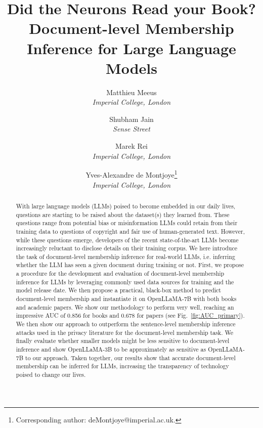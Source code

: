\documentclass[twocolumn,10pt]{article}
\begin{document}
\date{}

\title{\Large \bf Did the Neurons Read your Book? \\
        Document-level Membership Inference for Large Language Models
        \vspace*{0.5cm}}

\author{
 {\rm Matthieu Meeus}\\
 \textit{Imperial College, London}
 \and
 {\rm Shubham Jain}\\
 \textit{Sense Street}
  \and
  {\rm Marek Rei}\\
 \textit{Imperial College, London}
 \and
  {\rm Yves-Alexandre de Montjoye\footnote{Corresponding author: deMontjoye@imperial.ac.uk.}}\\
 \textit{Imperial College, London}
} 

\maketitle

\begin{abstract}


With large language models (LLMs) poised to become embedded in our daily lives, questions are starting to be raised about the dataset(s) they learned from. These questions range from potential bias or misinformation LLMs could retain from their training data to questions of copyright and fair use of human-generated text. However, while these questions emerge, developers of the recent state-of-the-art LLMs become increasingly reluctant to disclose details on their training corpus. We here introduce the task of document-level membership inference for real-world LLMs, i.e. inferring whether the LLM has seen a given document during training or not. First, we propose a procedure
for the development and evaluation of document-level
membership inference for LLMs by leveraging commonly used data sources for training and the model release date. We then propose a practical, black-box method to predict document-level membership and instantiate it on OpenLLaMA-7B with both books and academic papers. We show our methodology to perform very well, reaching an impressive AUC of 0.856 for books and 0.678 for papers (see Fig.~\ref{fig:AUC_primary}). We then show our approach to outperform the sentence-level membership inference attacks used in the privacy literature for the document-level membership task. We finally evaluate whether smaller models might be less sensitive to document-level inference and show OpenLLaMA-3B to be approximately as sensitive as OpenLLaMA-7B to our approach. Taken together, our results show that accurate document-level membership can be inferred for LLMs, increasing the transparency of technology poised to change our lives. 

\end{abstract}
\end{document}
